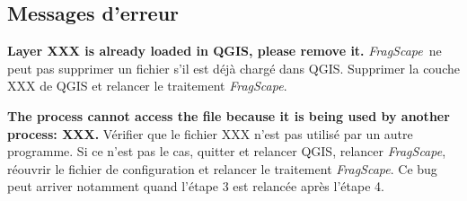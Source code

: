 \documentclass[11pt]{article}
\newcommand{\tool}{\emph{FragScape}}
\let\tempone\itemize
\let\temptwo\enditemize
\renewenvironment{itemize}{\tempone\addtolength{\itemsep}{-0.5\baselineskip}}{\temptwo}
\begin{document}
\subsection*{Messages d'erreur}

\begin{itemize}
    \item \textbf{\color{red}Layer XXX is already loaded in QGIS, please remove it.} \tool\ ne peut pas supprimer un fichier s'il est déjà chargé dans QGIS. Supprimer la couche XXX de QGIS et relancer le traitement \tool.
    \item \textbf{\color{red}The process cannot access the file because it is being used by another process: XXX.} Vérifier que le fichier XXX n'est pas utilisé par un autre programme. Si ce n'est pas le cas, quitter et relancer QGIS, relancer \tool, réouvrir le fichier de configuration et relancer le traitement \tool. Ce bug peut arriver notamment quand l'étape 3 est relancée après l'étape 4.
\end{itemize}


\printbibliography
\end{document}
